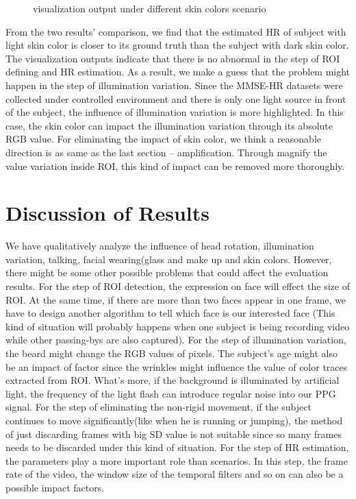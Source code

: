 \begin{figure}[ht]
\hspace{-0.3in}
\caption{visualization output under different skin colors scenario}\label{fig:noted-figure}
\end{figure}

From the two results’ comparison, we find that the estimated HR of subject with light skin color is closer to its ground truth than the subject with dark skin color. The visualization outputs indicate that there is no abnormal in the step of ROI defining and HR estimation. As a result, we make a guess that the problem might happen in the step of illumination variation. Since the MMSE-HR datasets were collected under controlled environment and there is only one light source in front of the subject, the influence of illumination variation is more highlighted. In this case, the skin color can impact the illumination variation through its absolute RGB value. For eliminating the impact of skin color, we think a reasonable direction is as same as the last section -- amplification. Through magnify the value variation inside ROI, this kind of impact can be removed more thoroughly.


\section{Discussion of Results}
We have qualitatively analyze the influence of head rotation, illumination variation, talking, facial wearing(glass and make up and skin colors. However, there might be some other possible problems that could affect the evaluation results. For the step of ROI detection, the expression on face will effect the size of ROI. At the same time, if there are more than two faces appear in one frame, we have to design another algorithm to tell which face is our interested face (This kind of situation will probably happens when one subject is being recording video while other passing-bys are also captured). For the step of illumination variation, the beard might change the RGB values of pixels. The subject's age might also be an impact of factor since the wrinkles might influence the value of color traces extracted from ROI. What's more, if the background is illuminated by artificial light, the frequency of the light flash can introduce regular noise into our PPG signal. For the step of eliminating the non-rigid movement, if the subject continues to move significantly(like when he is running or jumping), the method of just discarding frames with big SD value is not suitable since so many frames needs to be discarded under this kind of situation. For the step of HR estimation, the parameters play a more important role than scenarios. In this step, the frame rate of the video, the window size of the temporal filters and so on can also be a possible impact factors. 
